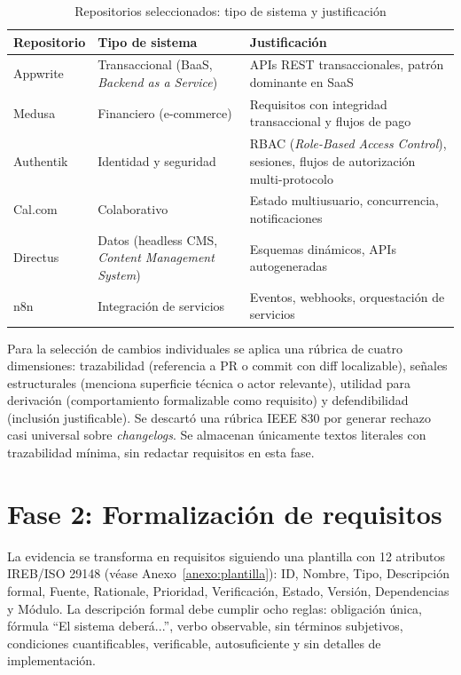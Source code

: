 \begin{table}[htbp]
\centering
\caption{Repositorios seleccionados: tipo de sistema y justificaci\'on}
\label{tab:repos}
\begin{tabularx}{\textwidth}{lp{3.5cm}X}
\toprule
\textbf{Repositorio} & \textbf{Tipo de sistema} & \textbf{Justificaci\'on} \\
\midrule
Appwrite & Transaccional (BaaS, \emph{Backend as a Service}) & APIs REST transaccionales, patr\'on dominante en SaaS \\
Medusa & Financiero (e-commerce) & Requisitos con integridad transaccional y flujos de pago \\
Authentik & Identidad y seguridad & RBAC (\emph{Role-Based Access Control}), sesiones, flujos de autorizaci\'on multi-protocolo \\
Cal.com & Colaborativo & Estado multiusuario, concurrencia, notificaciones \\
Directus & Datos (headless CMS, \emph{Content Management System}) & Esquemas din\'amicos, APIs autogeneradas \\
n8n & Integraci\'on de servicios & Eventos, webhooks, orquestaci\'on de servicios \\
\bottomrule
\end{tabularx}
\end{table}

Para la selecci\'on de cambios individuales se aplica una r\'ubrica de cuatro dimensiones: trazabilidad (referencia a PR o commit con diff localizable), se\~nales estructurales (menciona superficie t\'ecnica o actor relevante), utilidad para derivaci\'on (comportamiento formalizable como requisito) y defendibilidad (inclusi\'on justificable). Se descart\'o una r\'ubrica IEEE 830 por generar rechazo casi universal sobre \emph{changelogs}. Se almacenan \'unicamente textos literales con trazabilidad m\'inima, sin redactar requisitos en esta fase.

\section{Fase 2: Formalizaci\'on de requisitos}

La evidencia se transforma en requisitos siguiendo una plantilla con 12 atributos IREB/ISO 29148 (v\'ease Anexo~\ref{anexo:plantilla}): ID, Nombre, Tipo, Descripci\'on formal, Fuente, Rationale, Prioridad, Verificaci\'on, Estado, Versi\'on, Dependencias y M\'odulo. La descripci\'on formal debe cumplir ocho reglas: obligaci\'on \'unica, f\'ormula ``El sistema deber\'a...'', verbo observable, sin t\'erminos subjetivos, condiciones cuantificables, verificable, autosuficiente y sin detalles de implementaci\'on.

